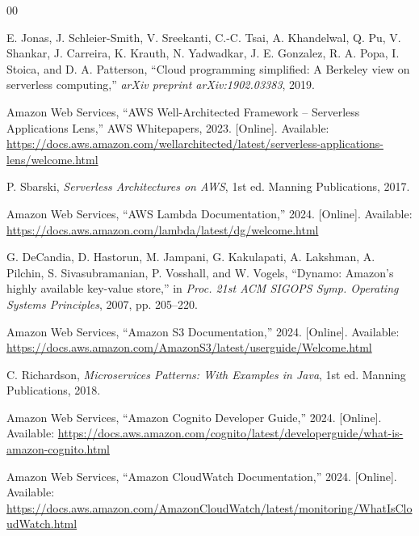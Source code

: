 \documentclass[conference]{IEEEtran}
\begin{document}
\begin{thebibliography}{00}

E. Jonas, J. Schleier-Smith, V. Sreekanti, C.-C. Tsai, A. Khandelwal, Q. Pu, V. Shankar, J. Carreira, K. Krauth, N. Yadwadkar, J. E. Gonzalez, R. A. Popa, I. Stoica, and D. A. Patterson, ``Cloud programming simplified: A Berkeley view on serverless computing,'' \textit{arXiv preprint arXiv:1902.03383}, 2019.

Amazon Web Services, ``AWS Well-Architected Framework -- Serverless Applications Lens,'' AWS Whitepapers, 2023. [Online]. Available: \url{https://docs.aws.amazon.com/wellarchitected/latest/serverless-applications-lens/welcome.html}

P. Sbarski, \textit{Serverless Architectures on AWS}, 1st ed. Manning Publications, 2017.

Amazon Web Services, ``AWS Lambda Documentation,'' 2024. [Online]. Available: \url{https://docs.aws.amazon.com/lambda/latest/dg/welcome.html}

G. DeCandia, D. Hastorun, M. Jampani, G. Kakulapati, A. Lakshman, A. Pilchin, S. Sivasubramanian, P. Vosshall, and W. Vogels, ``Dynamo: Amazon's highly available key-value store,'' in \textit{Proc. 21st ACM SIGOPS Symp. Operating Systems Principles}, 2007, pp. 205--220.

Amazon Web Services, ``Amazon S3 Documentation,'' 2024. [Online]. Available: \url{https://docs.aws.amazon.com/AmazonS3/latest/userguide/Welcome.html}

C. Richardson, \textit{Microservices Patterns: With Examples in Java}, 1st ed. Manning Publications, 2018.

Amazon Web Services, ``Amazon Cognito Developer Guide,'' 2024. [Online]. Available: \url{https://docs.aws.amazon.com/cognito/latest/developerguide/what-is-amazon-cognito.html}

Amazon Web Services, ``Amazon CloudWatch Documentation,'' 2024. [Online]. Available: \url{https://docs.aws.amazon.com/AmazonCloudWatch/latest/monitoring/WhatIsCloudWatch.html}

\end{thebibliography}
\end{document}
